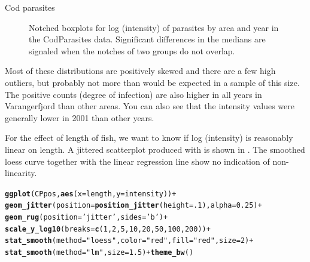 \documentclass[11pt]{book}\usepackage[]{graphicx}\usepackage[]{color}
\makeatletter
\newcommand{\hlnum}[1]{\textcolor[rgb]{0.686,0.059,0.569}{#1}}%
\newcommand{\hlstr}[1]{\textcolor[rgb]{0.192,0.494,0.8}{#1}}%
\newcommand{\hlopt}[1]{\textcolor[rgb]{0,0,0}{#1}}%
\newcommand{\hlstd}[1]{\textcolor[rgb]{0.345,0.345,0.345}{#1}}%
\newcommand{\hlkwc}[1]{\textcolor[rgb]{0.333,0.667,0.333}{#1}}%
\newcommand{\hlkwd}[1]{\textcolor[rgb]{0.737,0.353,0.396}{\textbf{#1}}}%
\newenvironment{kframe}{%
 \def\at@end@of@kframe{}%
 \ifinner\ifhmode%
  \def\at@end@of@kframe{\end{minipage}}%
  \begin{minipage}{\columnwidth}%
 \fi\fi%
 \def\FrameCommand##1{\hskip\@totalleftmargin \hskip-\fboxsep
 \colorbox{shadecolor}{##1}\hskip-\fboxsep
     \hskip-\linewidth \hskip-\@totalleftmargin \hskip\columnwidth}%
 \MakeFramed {\advance\hsize-\width
   \@totalleftmargin\z@ \linewidth\hsize
   \@setminipage}}%
 {\par\unskip\endMakeFramed%
 \at@end@of@kframe}
\newenvironment{knitrout}{}{} %
\renewenvironment{knitrout}{\small\renewcommand{\baselinestretch}{.85}}{} %
\makeatother
\begin{document}
\begin{Example}[cod1]{Cod parasites}
\begin{knitrout}
\begin{figure}[!htbp]
\caption[Notched boxplots for log (intensity) of parasites by area and year in the CodParasites data]{Notched boxplots for log (intensity) of parasites by area and year in the CodParasites data. Significant differences in the medians are signaled when the notches of two groups do not overlap.\label{fig:cod1-boxplot}}
\end{figure}


\end{knitrout}
Most of these distributions are positively skewed and
there are a few high outliers, but probably not more than would be expected in a sample of this size.
The positive counts (degree of infection) are also higher in all years in Varangerfjord than other
areas. You can also see that the intensity values were generally lower in 2001 than other years.

For the effect of length of fish, we want to know if log (intensity) is reasonably
linear on length.  A jittered scatterplot produced with  is shown in .
The smoothed loess curve together with the linear regression line show no indication of non-linearity.

\begin{knitrout}
\color{fgcolor}\begin{kframe}
\begin{alltt}
\hlkwd{ggplot}\hlstd{(CPpos,} \hlkwd{aes}\hlstd{(}\hlkwc{x}\hlstd{=length,} \hlkwc{y}\hlstd{=intensity))} \hlopt{+}
  \hlkwd{geom_jitter}\hlstd{(}\hlkwc{position}\hlstd{=}\hlkwd{position_jitter}\hlstd{(}\hlkwc{height}\hlstd{=}\hlnum{.1}\hlstd{),} \hlkwc{alpha}\hlstd{=}\hlnum{0.25}\hlstd{)} \hlopt{+}
  \hlkwd{geom_rug}\hlstd{(}\hlkwc{position}\hlstd{=}\hlstr{'jitter'}\hlstd{,} \hlkwc{sides}\hlstd{=}\hlstr{'b'}\hlstd{)} \hlopt{+}
  \hlkwd{scale_y_log10}\hlstd{(}\hlkwc{breaks}\hlstd{=}\hlkwd{c}\hlstd{(}\hlnum{1}\hlstd{,}\hlnum{2}\hlstd{,}\hlnum{5}\hlstd{,}\hlnum{10}\hlstd{,}\hlnum{20}\hlstd{,}\hlnum{50}\hlstd{,}\hlnum{100}\hlstd{,} \hlnum{200}\hlstd{))} \hlopt{+}
  \hlkwd{stat_smooth}\hlstd{(}\hlkwc{method}\hlstd{=}\hlstr{"loess"}\hlstd{,} \hlkwc{color}\hlstd{=}\hlstr{"red"}\hlstd{,} \hlkwc{fill}\hlstd{=}\hlstr{"red"}\hlstd{,} \hlkwc{size}\hlstd{=}\hlnum{2}\hlstd{)} \hlopt{+}
  \hlkwd{stat_smooth}\hlstd{(}\hlkwc{method}\hlstd{=}\hlstr{"lm"}\hlstd{,} \hlkwc{size}\hlstd{=}\hlnum{1.5}\hlstd{)} \hlopt{+} \hlkwd{theme_bw}\hlstd{()}
\end{alltt}
\end{kframe}\begin{figure}[!htbp]



\end{figure}
\end{knitrout}
\end{Example}
\end{document}
